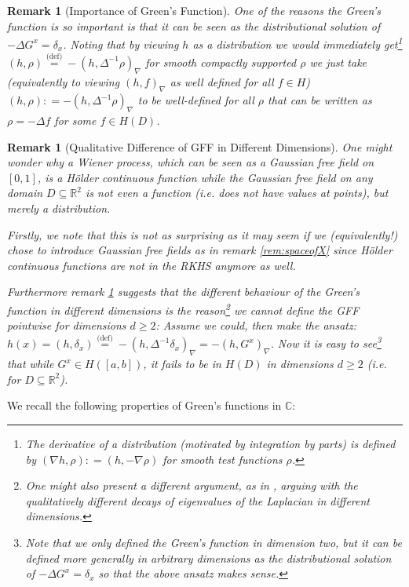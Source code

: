 \documentclass[11pt,reqno]{amsart}
\numberwithin{equation}{section}
\newtheorem{rem}[thm]{Remark}
\newcommand{\eqbydef}{\mathrel{\stackrel{\text{(def)}}{=}}}
\newcommand{\deq}{\mathrel{\mathop:}=}
\begin{document}
\begin{rem}[Importance of Green's Function]\label{rem:usesofGreensfct}
	One of the reasons the Green's function is so important is that it can be seen as the distributional solution of $-\Delta G^x = \delta_x$. 
	Noting that by viewing $h$ as a distribution we would immediately get\footnote{The derivative of a distribution (motivated by integration by parts) is defined by $(\nabla h,\rho)\deq(h,-\nabla\rho)$ for smooth test functions $\rho$.} $(h,\rho)\eqbydef -(h,\Delta^{-1}\rho)_\nabla$ for smooth compactly supported $\rho$  we just take (equivalently to viewing $(h,f)_\nabla$ as well defined for all $f\in H$) $(h,\rho)\deq -(h,\Delta^{-1}\rho)_\nabla$ to be well-defined for all $\rho$ that can be written as $\rho = -\Delta f$ for some $f\in H(D)$.
\end{rem}

\begin{rem}[Qualitative Difference of GFF in Different Dimensions]
	One might wonder why a Wiener process, which can be seen as a Gaussian free field on $[0,1]$, is a H\"older continuous function while the Gaussian free field on any domain $D\subseteq \mathbb R^2$ is not even a function (i.e. does not have values at points), but merely a distribution.
	
	Firstly, we note that this is not as surprising as it may seem if we (equivalently!) chose to introduce Gaussian free fields as in remark \ref{rem:spaceofX} since H\"older continuous functions are not in the RKHS anymore as well.
	
	Furthermore remark \ref{rem:usesofGreensfct} suggests that the different behaviour of the Green's function in different dimensions is the reason\footnote{One might also present a different argument, as in \cite{She07}, arguing with the qualitatively different decays of eigenvalues of the Laplacian in different dimensions.} we cannot define the GFF pointwise for dimensions $d\geq 2$: Assume we could, then make the ansatz: $h(x)=(h,\delta_x)\eqbydef -(h,\Delta^{-1}\delta_x)_\nabla = -(h,G^x)_\nabla.$ Now it is easy to see\footnote{Note that we only defined the Green's function in dimension two, but it can be defined more generally in arbitrary dimensions as the distributional solution of $-\Delta G^x=\delta_x$ so that the above ansatz makes sense.} that while $G^x\in H([a,b])$, it fails to be in $H(D)$ in dimensions $d\geq 2$ (i.e. for $D\subseteq\mathbb R^2$).
\end{rem}

We recall the following properties of Green's functions in $\mathbb C$:
\end{document}
